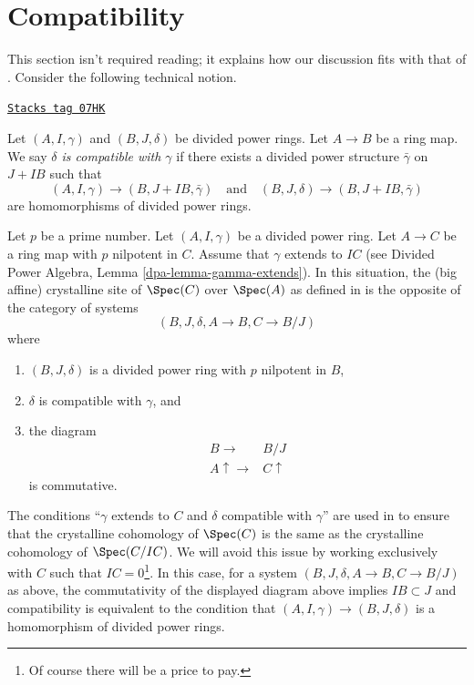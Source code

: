 \section{Compatibility}
\label{crystalline-section-compatibility}
This section isn't required reading; it explains how our discussion
fits with that of \cite{Berthelot}.
Consider the following technical notion.

\begin{definition}[Compatible]
\label{crystalline-definition-compatible}
\href{https://stacks.math.columbia.edu/tag/07HK}{\texttt{Stacks tag 07HK}}

Let $(A, I, \gamma)$ and $(B, J, \delta)$ be divided power rings.
Let $A \to B$ be a ring map. We say
{\it $\delta$ is compatible with $\gamma$}
if there exists a divided power structure $\bar\gamma$ on
$J + IB$ such that
$$
(A, I, \gamma) \to (B, J + IB, \bar \gamma)\quad\text{and}\quad
(B, J, \delta) \to (B, J + IB, \bar \gamma)
$$
are homomorphisms of divided power rings.
\end{definition}

Let $p$ be a prime number. Let $(A, I, \gamma)$ be a divided power ring.
Let $A \to C$ be a ring map with $p$ nilpotent in $C$.
Assume that $\gamma$ extends to $IC$ (see
Divided Power Algebra, Lemma \ref{dpa-lemma-gamma-extends}).
In this situation, the (big affine) crystalline site of
$\Spec(C)$ over $\Spec(A)$
as defined in \cite{Berthelot}
is the opposite of the category of systems
$$
(B, J, \delta, A \to B, C \to B/J)
$$
where
\begin{enumerate}
\item $(B, J, \delta)$ is a divided power ring with $p$ nilpotent in $B$,
\item $\delta$ is compatible with $\gamma$, and
\item the diagram
$$
\begin{array}{cc}B \longrightarrow & B/J \\ A \uparrow\longrightarrow & C \uparrow\end{array}
$$
is commutative.
\end{enumerate}
The conditions
``$\gamma$ extends to $C$ and $\delta$ compatible with $\gamma$''
are used in \cite{Berthelot} to ensure that
the crystalline cohomology of $\Spec(C)$ is the same as the crystalline
cohomology of $\Spec(C/IC)$. We will avoid this issue
by working exclusively with $C$ such that $IC = 0$\footnote{Of course there
will be a price to pay.}. In this case,
for a system $(B, J, \delta, A \to B, C \to B/J)$ as above,
the commutativity of the displayed diagram above implies $IB \subset J$ and
compatibility is equivalent to the condition that
$(A, I, \gamma) \to (B, J, \delta)$ is a homomorphism of divided
power rings.

